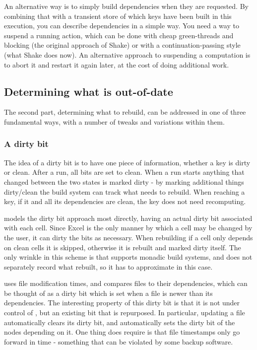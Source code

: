 An alternative way is to simply build dependencies when they are requested. By combining that with a transient store of which keys have been built in this execution, you can describe dependencies in a simple way. You need a way to suspend a running action, which can be done with cheap green-threads and blocking (the original approach of Shake) or with a continuation-passing style (what Shake does now). An alternative approach to suspending a computation is to abort it and restart it again later, at the cost of doing additional work.


\subsection{Determining what is out-of-date}

The second part, determining what to rebuild, can be addressed in one of three fundamental ways, with a number of tweaks and variations within them.

\subsubsection{A dirty bit}

The idea of a dirty bit is to have one piece of information, whether a key is dirty or clean. After a run, all bits are set to clean. When a run starts anything that changed between the two states is marked dirty - by marking additional things dirty/clean the build system can track what needs to rebuild. When reaching a key, if it and all its dependencies are clean, the key does not need recomputing.

\Excel models the dirty bit approach most directly, having an actual dirty bit associated with each cell. Since Excel is the only manner by which a cell may be changed by the user, it can dirty the bits as necessary. When rebuilding if a cell only depends on clean cells it is skipped, otherwise it is rebuilt and marked dirty itself. The only wrinkle in this scheme is that \Excel supports monadic build systems, and does not separately record what rebuilt, so it has to approximate in this case.

\Make uses file modification times, and compares files to their dependencies, which can be thought of as a dirty bit which is set when a file is newer than its dependencies. The interesting property of this dirty bit is that it is not under control of \Make, but an existing bit that is repurposed. In particular, updating a file automatically clears its dirty bit, and automatically sets the dirty bit of the nodes depending on it. One thing \Make does require is that file timestamps only go forward in time - something that can be violated by some backup software.

